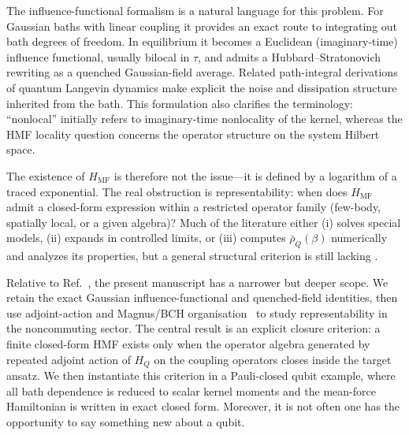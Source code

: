 The influence-functional formalism is a natural language for this problem.
For Gaussian baths with linear coupling it provides an exact route to
integrating out bath degrees of freedom\cite{feynmanTheoryGeneralQuantum1963a,caldeiraQuantumTunnellingDissipative1983a,grabertQuantumBrownianMotion1988}.
In equilibrium it becomes a Euclidean (imaginary-time) influence functional,
usually bilocal in $\tau$, and admits a Hubbard--Stratonovich rewriting as a
quenched Gaussian-field average\cite{hubbardCalculationPartitionFunctions1959a,stratonovich1957QDistro,stockburgerExactNumberRepresentation2002}.
Related path-integral derivations of quantum Langevin dynamics make explicit the
noise and dissipation structure inherited from the bath\cite{kleinertQuantumLangevinEquation1995,vankampenDerivationQuantumLangevin1997}.
This formulation also clarifies the terminology: ``nonlocal'' initially refers
to imaginary-time nonlocality of the kernel, whereas the HMF locality question
concerns the operator structure on the system Hilbert space.

The existence of $H_{\mathrm{MF}}$ is therefore not the issue---it is defined by
a logarithm of a traced exponential. The real obstruction is representability:
when does $H_{\mathrm{MF}}$ admit a closed-form expression within a restricted
operator family (few-body, spatially local, or a given algebra)? Much of the
literature either (i) solves special models, (ii) expands in controlled limits,
or (iii) computes $\bar\rho_Q(\beta)$ numerically and analyzes its properties, but a
general structural criterion is still lacking
\cite{burkeStructureHamiltonianMean2024,duGeneralizedHamiltonianMeanforce2025a,cresserWeakUltrastrongCoupling2021a}.

Relative to Ref.~\cite{mccaulMeanForceHamiltoniansInfluence2026}, the present
manuscript has a narrower but deeper scope. We retain the exact Gaussian
influence-functional and quenched-field identities, then use adjoint-action and
Magnus/BCH organisation~\cite{magnusExponentialSolutionDifferential1954a,blanesMagnusExpansionIts2009,weiLieAlgebraicSolution1963} to study representability in the noncommuting sector.
The central result is an explicit closure criterion: a finite closed-form HMF
exists only when the operator algebra generated by repeated adjoint action of
$H_Q$ on the coupling operators closes inside the target ansatz. We then
instantiate this criterion in a Pauli-closed qubit example, where all bath
dependence is reduced to scalar kernel moments and the mean-force Hamiltonian
is written in exact closed form. Moreover, it is not often one has the opportunity to say something new about a qubit. 


